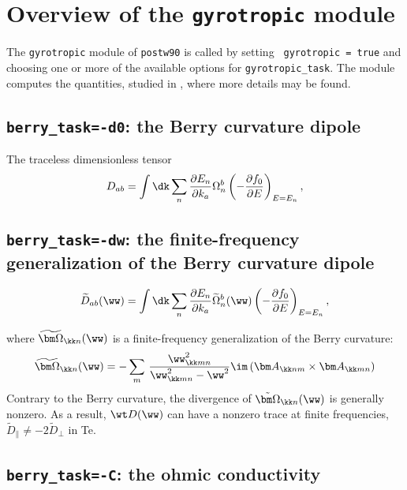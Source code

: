 \chapter{Overview of the {\tt gyrotropic} module \label{ch:gyrotropic}}


The {\tt gyrotropic} module of {\tt postw90} is called by setting {\tt
  gyrotropic = true} and choosing one or more of the available options for
{\tt gyrotropic\_task}. The module computes the quantities, studied in 
 \cite{tsirkin-arxiv17}, where more details may be found.

\section{{\tt berry\_task=-d0}: the Berry curvature dipole  }

The traceless dimensionless tensor
\begin{equation}
\label{eq:D_ab}
D_{ab}=\int\dk\sum_n
\frac{\partial E_n}{\partial{k_a}}
\Omega_n^b
\left(-\frac{\partial f_0}{\partial E}\right)_{E=E_n},
\end{equation}


\section{{\tt berry\_task=-dw}: the finite-frequency generalization of the Berry curvature dipole  }

\begin{equation}
\label{eq:D-tilde}
\widetilde{D}_{ab}(\ww)=\int\dk\sum_n
\frac{\partial E_n}{\partial{k_a}}\widetilde\Omega^b_n(\ww)
\left(-\frac{\partial f_0}{\partial E}\right)_{E=E_n},
\end{equation}

where $\widetilde{\bm\Omega}_{\kk n}(\ww)$ is a finite-frequency
generalization of the Berry curvature:
%
%
\begin{equation}
\label{eq:curv-w}
\widetilde{\bm\Omega}_{\kk n}(\ww)=-
\sum_m\,\frac{\ww^2_{\kk mn}}{\ww^2_{\kk mn}-\ww^2}
\im\left({\bm A}_{\kk nm}\times{\bm A}_{\kk mn}\right)
\end{equation}
Contrary to the Berry
  curvature, the divergence of $\tilde{\bm\Omega}_{\kk n}(\ww)$ is
  generally nonzero. As a result, $\wt D(\ww)$ 
can have a nonzero trace at finite frequencies, $\tilde{D}_\|\neq-2\tilde{D}_\perp$ in Te.

\section{{\tt berry\_task=-C}: the ohmic  conductivity }

